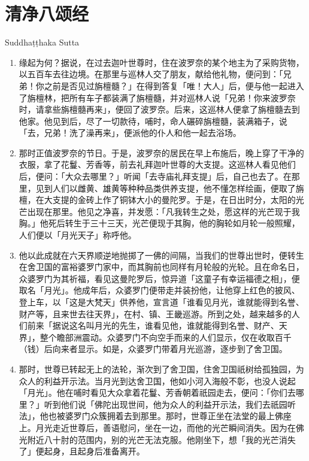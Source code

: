 \section{清净八颂经}

\begin{center}Suddhaṭṭhaka Sutta\end{center}\vspace{1em}

\begin{enumerate}\item 缘起为何？据说，在过去迦叶世尊时，住在波罗奈的某个地主为了采购货物，以五百车去往边境。在那里与巡林人交了朋友，献给他礼物，便问到：「兄弟！你之前是否见过旃檀髓？」在得到答复「唯！大人」后，便与他一起进入了旃檀林，把所有车子都装满了旃檀髓，并对巡林人说「兄弟！你来波罗奈时，请拿些旃檀髓再来」，便回了波罗奈。后来，这巡林人便拿了旃檀髓去到他家。他见到后，尽了一切款待，哺时，命人碾碎旃檀髓，装满箱子，说「去，兄弟！洗了澡再来」，便派他的仆人和他一起去浴场。
\item 那时正值波罗奈的节日。于是，波罗奈的居民在早上布施后，晚上穿了干净的衣服，拿了花鬘、芳香等，前去礼拜迦叶世尊的大支提。这巡林人看见他们后，便问：「大众去哪里？」听闻「去寺庙礼拜支提」后，自己也去了。在那里，见到人们以雌黄、雄黄等种种品类供养支提，他不懂怎样绘画，便取了旃檀，在大支提的金砖上作了铜钵大小的曼陀罗。于是，在日出时分，太阳的光芒出现在那里。他见之净喜，并发愿：「凡我转生之处，愿这样的光芒现于我胸。」他死后转生于三十三天，光芒便现于其胸，他的胸轮如月轮一般照耀，人们便以「月光天子」称呼他。
\item 他以此成就在六天界顺逆地抛掷了一佛的间隔，当我们的世尊出世时，便转生在舍卫国的富裕婆罗门家中，而其胸前也同样有月轮般的光轮。且在命名日，众婆罗门为其祈福，看见这曼陀罗后，惊异道「这童子有幸运福德之相」，便取名「月光」。他成年后，众婆罗门便带走并装扮他，让他穿上红色的披风、登上车，以「这是大梵天」供养他，宣言道「谁看见月光，谁就能得到名誉、财产等，且来世去往天界」，在村、镇、王畿巡游。所到之处，越来越多的人们前来「据说这名叫月光的先生，谁看见他，谁就能得到名誉、财产、天界」，整个瞻部洲震动。众婆罗门不向空手而来的人们显示，仅在收取百千（钱）后向来者显示。如是，众婆罗门带着月光巡游，逐步到了舍卫国。
\item 那时，世尊已转起无上的法轮，渐次到了舍卫国，住舍卫国祇树给孤独园，为众人的利益开示法。当月光到达舍卫国，他如小河入海般不彰，也没人说起「月光」。他在哺时看见大众拿着花鬘、芳香朝着祇园走去，便问：「你们去哪里？」听到他们说「佛陀出现世间，他为众人的利益开示法，我们去祇园听法」，他也被婆罗门众簇拥着去到那里。那时，世尊正坐在法堂的最上佛座上。月光走近世尊后，善语慰问，坐在一边，而他的光芒瞬间消失。因为在佛光附近八十肘的范围内，别的光芒无法克服。他刚坐下，想「我的光芒消失了」便起身，且起身后准备离开。

\end{enumerate}
